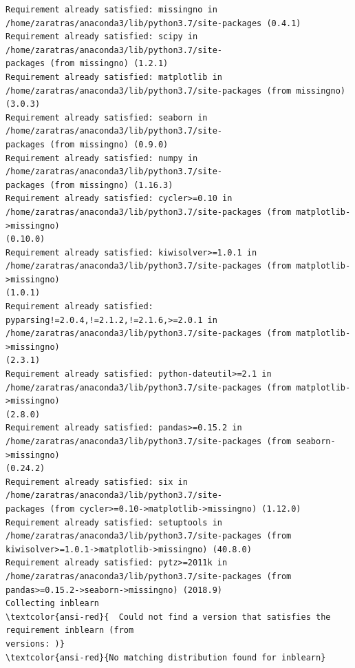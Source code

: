 \documentclass[8pt,onecolumn,aps,pra]{revtex4-1}
\begin{document}
    \begin{Verbatim}[commandchars=\\\{\}]
Requirement already satisfied: missingno in
/home/zaratras/anaconda3/lib/python3.7/site-packages (0.4.1)
Requirement already satisfied: scipy in /home/zaratras/anaconda3/lib/python3.7/site-
packages (from missingno) (1.2.1)
Requirement already satisfied: matplotlib in
/home/zaratras/anaconda3/lib/python3.7/site-packages (from missingno) (3.0.3)
Requirement already satisfied: seaborn in /home/zaratras/anaconda3/lib/python3.7/site-
packages (from missingno) (0.9.0)
Requirement already satisfied: numpy in /home/zaratras/anaconda3/lib/python3.7/site-
packages (from missingno) (1.16.3)
Requirement already satisfied: cycler>=0.10 in
/home/zaratras/anaconda3/lib/python3.7/site-packages (from matplotlib->missingno)
(0.10.0)
Requirement already satisfied: kiwisolver>=1.0.1 in
/home/zaratras/anaconda3/lib/python3.7/site-packages (from matplotlib->missingno)
(1.0.1)
Requirement already satisfied: pyparsing!=2.0.4,!=2.1.2,!=2.1.6,>=2.0.1 in
/home/zaratras/anaconda3/lib/python3.7/site-packages (from matplotlib->missingno)
(2.3.1)
Requirement already satisfied: python-dateutil>=2.1 in
/home/zaratras/anaconda3/lib/python3.7/site-packages (from matplotlib->missingno)
(2.8.0)
Requirement already satisfied: pandas>=0.15.2 in
/home/zaratras/anaconda3/lib/python3.7/site-packages (from seaborn->missingno)
(0.24.2)
Requirement already satisfied: six in /home/zaratras/anaconda3/lib/python3.7/site-
packages (from cycler>=0.10->matplotlib->missingno) (1.12.0)
Requirement already satisfied: setuptools in
/home/zaratras/anaconda3/lib/python3.7/site-packages (from
kiwisolver>=1.0.1->matplotlib->missingno) (40.8.0)
Requirement already satisfied: pytz>=2011k in
/home/zaratras/anaconda3/lib/python3.7/site-packages (from
pandas>=0.15.2->seaborn->missingno) (2018.9)
Collecting inblearn
\textcolor{ansi-red}{  Could not find a version that satisfies the requirement inblearn (from
versions: )}
\textcolor{ansi-red}{No matching distribution found for inblearn}

    \end{Verbatim}
\end{document}
